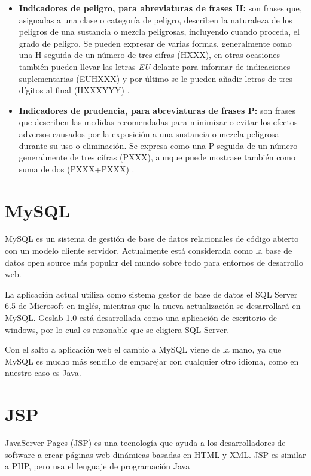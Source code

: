 \begin{itemize}
\item \textbf{Indicadores de peligro, para abreviaturas de frases H:} son frases que, asignadas a una clase o categoría de peligro, describen la naturaleza de los peligros de una sustancia o mezcla peligrosas, incluyendo cuando proceda, el grado de peligro. Se pueden expresar de varias formas, generalmente como una H seguida de un número de tres cifras (HXXX), en otras ocasiones también pueden llevar las letras \textit{EU} delante para informar de indicaciones suplementarias (EUHXXX) y por último se le pueden añadir letras de tres dígitos al final (HXXXYYY) \cite{Seguridad}.


\item \textbf{Indicadores de prudencia, para abreviaturas de frases P:} son frases que describen las medidas recomendadas para minimizar o evitar los efectos adversos causados por la exposición a una sustancia o mezcla peligrosa durante su uso o eliminación. Se expresa como una P seguida de un número generalmente de tres cifras (PXXX), aunque puede mostrase también como suma de dos (PXXX+PXXX)  \cite{Seguridad}.

\end{itemize}

\section{MySQL}

MySQL es un sistema de gestión de base de datos relacionales de código abierto con un modelo cliente servidor. Actualmente está considerada como la base de datos open source más popular del mundo sobre todo para entornos de desarrollo web.

La aplicación actual utiliza como sistema gestor de base de datos el SQL Server 6.5 de Microsoft en inglés, mientras que la  nueva actualización se desarrollará en MySQL. Geslab 1.0 está desarrollada como una aplicación de escritorio de windows, por lo cual es razonable que se eligiera SQL Server.

Con el salto a aplicación web el cambio a MySQL viene de la mano, ya que MySQL es mucho más sencillo de emparejar con cualquier otro idioma, como en nuestro caso es Java.


\section{JSP}

JavaServer Pages (JSP) es una tecnología que ayuda a los desarrolladores de software a crear páginas web dinámicas basadas en HTML y XML. JSP es similar a PHP, pero usa el lenguaje de programación Java \cite{wiki:JSP}

